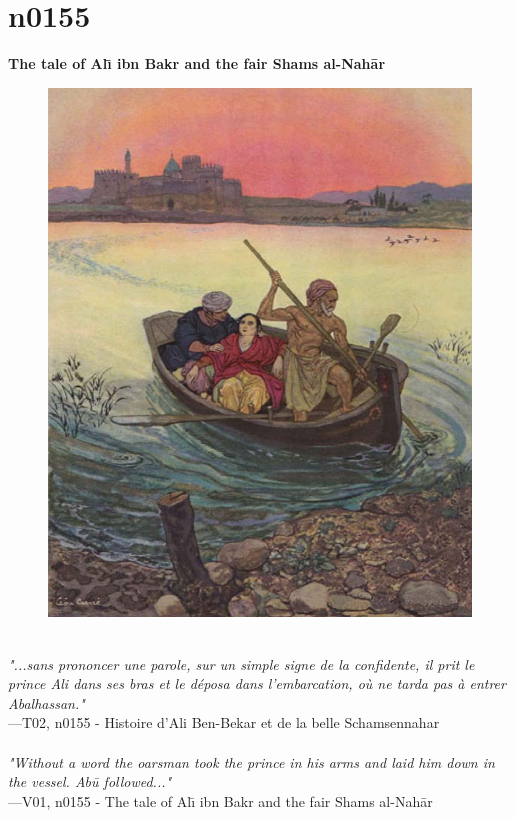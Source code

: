 \documentclass[../Carre_nights.tex]{subfiles}
\begin{document}
\newpage

\section{n0155}
\textbf{\Large{The tale of Al\={\i} ibn Bakr and the fair Shams al-Nah\=ar}} \\

\begin{figure}[ht]
\centering
\includegraphics[height=\figsize]{illustrations/volume_2/T02, n0155 - Histoire d'Ali Ben-Bekar et de la belle Schamsennahar.jpg}
\end{figure}

\textit{\\
"...sans prononcer une parole, sur un simple signe de la confidente, il prit le prince Ali dans ses bras et le déposa dans l’embarcation, où ne tarda pas à entrer Abalhassan."} \\
—T02, n0155 - Histoire d'Ali Ben-Bekar et de la belle Schamsennahar \\~\\
\textit{"Without a word the oarsman took the prince in his arms and laid him down in the vessel. Ab\=u followed..."} \\
—V01, n0155 - The tale of Al\={\i} ibn Bakr and the fair Shams al-Nah\=ar
\end{document}
